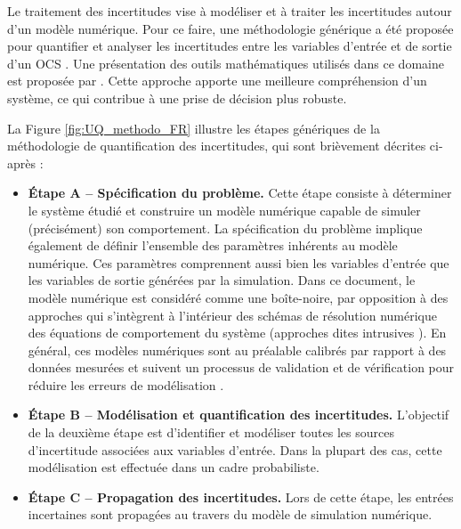 Le traitement des incertitudes vise à mod\'{e}liser et à traiter les incertitudes autour d'un modèle num\'{e}rique. 
Pour ce faire, une m\'{e}thodologie g\'{e}n\'{e}rique a \'{e}t\'{e} propos\'{e}e pour quantifier et analyser les incertitudes entre les variables d'entr\'{e}e et de sortie d'un OCS \citep{rocquigny_2008,blanchard_2023}. 
Une pr\'{e}sentation des outils math\'{e}matiques utilis\'{e}s dans ce domaine est propos\'{e}e par \citet{sullivan_2015}.
Cette approche apporte une meilleure compr\'{e}hension d'un système, ce qui contribue à une prise de d\'{e}cision plus robuste.   


La Figure \ref{fig:UQ_methodo_FR} illustre les \'{e}tapes g\'{e}n\'{e}riques de la m\'{e}thodologie de quantification des incertitudes, qui sont brièvement d\'{e}crites ci-après :
\begin{itemize}
    \item[\textbullet] \textbf{\'Etape A -- Sp\'{e}cification du problème.} 
    Cette \'{e}tape consiste à d\'{e}terminer le système \'{e}tudi\'{e} et construire un modèle num\'{e}rique capable de simuler (pr\'{e}cis\'{e}ment) son comportement. 
    La sp\'{e}cification du problème implique \'{e}galement de d\'{e}finir l'ensemble des paramètres inh\'{e}rents au modèle num\'{e}rique. 
    Ces paramètres comprennent aussi bien les variables d'entr\'{e}e que les variables de sortie g\'{e}n\'{e}r\'{e}es par la simulation. 
    Dans ce document, le modèle num\'{e}rique est consid\'{e}r\'{e} comme une boîte-noire, par opposition à des approches qui s'intègrent à l'int\'{e}rieur des sch\'{e}mas de r\'{e}solution num\'{e}rique des \'{e}quations de comportement du système (approches dites intrusives \citealp{lemaitre_2010}). 
    En g\'{e}n\'{e}ral, ces modèles num\'{e}riques sont au pr\'{e}alable calibr\'{e}s par rapport à des donn\'{e}es mesur\'{e}es et suivent un processus de validation et de v\'{e}rification pour r\'{e}duire les erreurs de mod\'{e}lisation \citep{oberkampf_2010_VVUQ,damblin_2015,carmassi_2018}.
    \item[\textbullet] \textbf{\'Etape B -- Mod\'{e}lisation et quantification des incertitudes.} 
    L'objectif de la deuxième \'{e}tape est d'identifier et mod\'{e}liser toutes les sources d'incertitude associ\'{e}es aux variables d'entr\'{e}e. 
    Dans la plupart des cas, cette mod\'{e}lisation est effectu\'{e}e dans un cadre probabiliste.
    \item[\textbullet] \textbf{\'Etape C -- Propagation des incertitudes.} 
    Lors de cette \'{e}tape, les entr\'{e}es incertaines sont propag\'{e}es au travers du modèle de simulation num\'{e}rique. 

\end{itemize}
